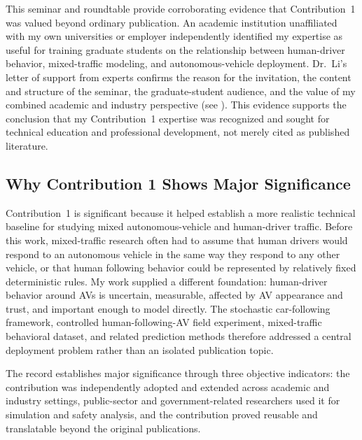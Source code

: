 \documentclass[11pt,letterpaper]{article}
\begin{document}
This seminar and roundtable provide corroborating evidence that Contribution~1 was valued beyond ordinary publication. An academic institution unaffiliated with my own universities or employer independently identified my expertise as useful for training graduate students on the relationship between human-driver behavior, mixed-traffic modeling, and autonomous-vehicle deployment. Dr.~Li's letter of support from experts confirms the reason for the invitation, the content and structure of the seminar, the graduate-student audience, and the value of my combined academic and industry perspective (see ). This evidence supports the conclusion that my Contribution~1 expertise was recognized and sought for technical education and professional development, not merely cited as published literature.

\subsection{Why Contribution 1 Shows Major Significance}

Contribution~1 is significant because it helped establish a more realistic technical baseline for studying mixed autonomous-vehicle and human-driver traffic. Before this work, mixed-traffic research often had to assume that human drivers would respond to an autonomous vehicle in the same way they respond to any other vehicle, or that human following behavior could be represented by relatively fixed deterministic rules. My work supplied a different foundation: human-driver behavior around AVs is uncertain, measurable, affected by AV appearance and trust, and important enough to model directly. The stochastic car-following framework, controlled human-following-AV field experiment, mixed-traffic behavioral dataset, and related prediction methods therefore addressed a central deployment problem rather than an isolated publication topic.

The record establishes major significance through three objective indicators: the contribution was independently adopted and extended across academic and industry settings, public-sector and government-related researchers used it for simulation and safety analysis, and the contribution proved reusable and translatable beyond the original publications.
\end{document}
